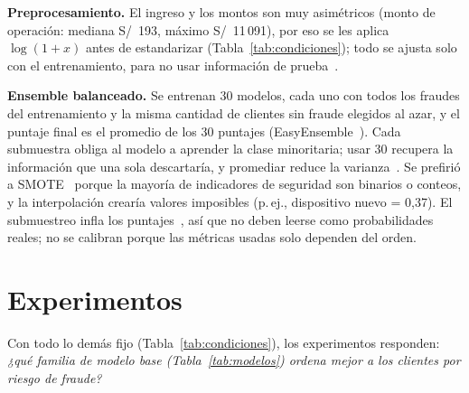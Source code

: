 \documentclass[conference,a4paper]{IEEEtran}
\begin{document}
\textbf{Preprocesamiento.} El ingreso y los montos son muy asimétricos (monto de operación:
mediana S/~193, máximo S/~11\,091), por eso se les aplica $\log(1+x)$ antes de estandarizar
(Tabla~\ref{tab:condiciones}); todo se ajusta solo con el entrenamiento, para no usar
información de prueba~\cite{leborgne2022}.

\textbf{Ensemble balanceado.} Se entrenan 30 modelos, cada uno con todos los fraudes del
entrenamiento y la misma cantidad de clientes sin fraude elegidos al azar, y el puntaje final
es el promedio de los 30 puntajes (EasyEnsemble~\cite{liu2009}). Cada submuestra
obliga al modelo a aprender la clase minoritaria; usar 30 recupera la información que una sola
descartaría, y promediar reduce la varianza~\cite{breiman1996}.
Se prefirió a SMOTE~\cite{chawla2002} porque la mayoría de indicadores de seguridad son binarios
o conteos, y la interpolación crearía valores imposibles (p.\,ej., dispositivo nuevo = 0,37).
El submuestreo infla los puntajes~\cite{dalpozzolo2015}, así que no deben leerse como
probabilidades reales; no se calibran porque las métricas usadas solo dependen del orden.

\section{Experimentos}\label{sec:experimentos}

Con todo lo demás fijo (Tabla~\ref{tab:condiciones}), los experimentos responden: \emph{¿qué
familia de modelo base (Tabla~\ref{tab:modelos}) ordena mejor a los clientes por riesgo de
fraude?}
\end{document}
